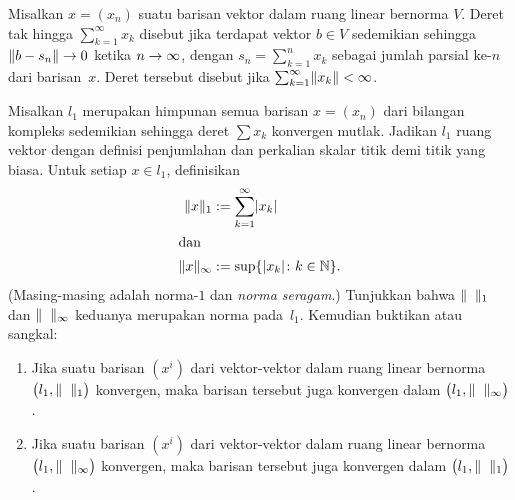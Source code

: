 \begin{defn}\label{C02319} Misalkan $x = (x_n)$ suatu barisan vektor dalam ruang linear
bernorma $V$. Deret tak hingga $\sum_{k=1}^\infty x_k$ disebut
 jika terdapat vektor $b \in V$ sedemikian sehingga
$\lVert b - s_n\rVert \rightarrow 0$ ketika $n \rightarrow \infty$, dengan
$s_n = \sum_{k=1}^n x_k$ sebagai jumlah parsial $\text{ke-}n$ dari barisan~$x$. Deret tersebut
disebut
 jika $\sum_{k=1}^\infty \lVert x_k\rVert < \infty$.
\end{defn}

\begin{exer}\label{C023191} Misalkan
$l_1$ merupakan himpunan semua barisan $x = (x_n)$ dari bilangan kompleks sedemikian
sehingga deret $\sum x_k$ konvergen mutlak. Jadikan $l_1$ ruang vektor dengan definisi
penjumlahan dan perkalian skalar titik demi titik yang biasa. Untuk setiap $x \in l_1$,
definisikan
   \begin{align*}
      \lVert x\rVert_1 &:= \sum_{k=1}^\infty \lvert x_k\rvert \\
   \intertext{dan}
      \lVert x\rVert_\infty &:= \sup\{\lvert x_k\rvert\colon k \in \mathbb{N}\}.
   \end{align*}
(Masing-masing adalah
norma-$1$ dan
\emph{norma seragam}.) Tunjukkan bahwa $\lVert\hphantom{x}\rVert_1$ dan
$\lVert\hphantom{x}\rVert_\infty$ keduanya merupakan norma pada~$l_1$. Kemudian buktikan atau
sangkal:
 \begin{enumerate}
  \item[(a)] Jika suatu barisan $(x^i)$ dari vektor-vektor dalam ruang linear bernorma
$\bigl(l_1, \lVert\hphantom{x}\rVert_1\bigr)$ konvergen, maka barisan tersebut juga konvergen
dalam $\bigl(l_1, \lVert\hphantom{x}\rVert_\infty\bigr)$.
  \item[(b)] Jika suatu barisan $(x^i)$ dari vektor-vektor dalam ruang linear bernorma
$\bigl(l_1, \lVert\hphantom{x}\rVert_\infty\bigr)$ konvergen, maka barisan tersebut juga
konvergen dalam $\bigl(l_1, \lVert\hphantom{x}\rVert_1\bigr)$.
 \end{enumerate}
\end{exer}








